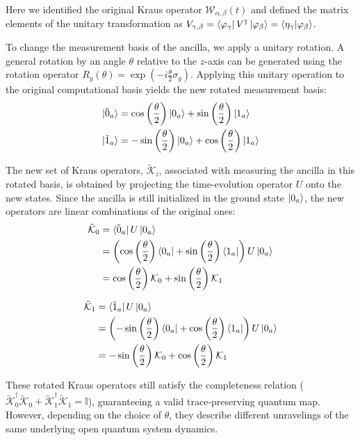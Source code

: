 \documentclass[a4paper,12pt]{article}
\begin{document}
Here we identified the original Kraus operator $ \mathcal{W}_{\alpha, \beta} \left(t\right) $ 
and defined the matrix elements of the unitary transformation as $ V_{\gamma, \beta} = \bra{\varphi_{\gamma}} V^{\dagger} \ket{\varphi_{\beta}} = \braket{\eta_{\gamma} | \varphi_{\beta}} $.

To change the measurement basis of the ancilla, we apply a unitary rotation. A general rotation by an angle $\theta$ relative to the $z$-axis can be generated using the rotation operator $R_y(\theta) = \exp\left(-i \frac{\theta}{2} \sigma_y\right)$. Applying this unitary operation to the original computational basis yields the new rotated measurement basis:
\begin{align}
	\ket{\tilde{0}_a} &= \cos\left(\frac{\theta}{2}\right)\ket{0_a} + \sin\left(\frac{\theta}{2}\right)\ket{1_a} \\
	\ket{\tilde{1}_a} &= -\sin\left(\frac{\theta}{2}\right)\ket{0_a} + \cos\left(\frac{\theta}{2}\right)\ket{1_a}
\end{align}

The new set of Kraus operators, $\tilde{\mathcal{K}}_i$, associated with measuring the ancilla in this rotated basis, is obtained by projecting the time-evolution operator $U$ onto the new states. Since the ancilla is still initialized in the ground state $\ket{0_a}$, the new operators are linear combinations of the original ones:
\begin{align}
	\tilde{\mathcal{K}}_{0} &= \bra{\tilde{0}_a} U \ket{0_a} \notag \\
	&= \left( \cos\left(\frac{\theta}{2}\right)\bra{0_a} + \sin\left(\frac{\theta}{2}\right)\bra{1_a} \right) U \ket{0_a} \notag \\
	&= \cos\left(\frac{\theta}{2}\right) \mathcal{K}_{0} + \sin\left(\frac{\theta}{2}\right) \mathcal{K}_{1}
\end{align}

\begin{align}
	\tilde{\mathcal{K}}_{1} &= \bra{\tilde{1}_a} U \ket{0_a} \notag \\
	&= \left( -\sin\left(\frac{\theta}{2}\right)\bra{0_a} + \cos\left(\frac{\theta}{2}\right)\bra{1_a} \right) U \ket{0_a} \notag \\
	&= -\sin\left(\frac{\theta}{2}\right) \mathcal{K}_{0} + \cos\left(\frac{\theta}{2}\right) \mathcal{K}_{1}
\end{align}

These rotated Kraus operators still satisfy the completeness relation ($\tilde{\mathcal{K}}_0^\dagger \tilde{\mathcal{K}}_0 + \tilde{\mathcal{K}}_1^\dagger \tilde{\mathcal{K}}_1 = \mathbb{I}$), guaranteeing a valid trace-preserving quantum map. However, depending on the choice of $\theta$, they describe different unravelings of the same underlying open quantum system dynamics.
\end{document}
